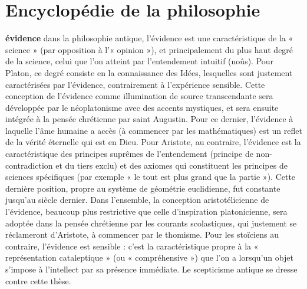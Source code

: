 
\section{Encyclopédie de la philosophie}

{\bf évidence} dans la philosophie antique,
l'évidence est une caractéristique de la
« science » (par opposition à l’« opinion »),
et principalement du plus haut
degré de la science, celui que l’on atteint
par l’entendement intuitif ({\it }noûs). Pour
Platon, ce degré consiste en la connaissance
des Idées, lesquelles sont justement
caractérisées par l’évidence, contrairement
à l'expérience sensible. Cette conception de
l'évidence comme illumination de source
transcendante sera développée par le néoplatonisme
avec des accents mystiques, et
sera ensuite intégrée à la pensée chrétienne
par saint Augustin. Pour ce dernier,
l'évidence à laquelle l’âme humaine
a accès (à commencer par les mathématiques)
est un reflet de la vérité éternelle
qui est en Dieu. Pour Aristote, au contraire,
l'évidence est la caractéristique des
principes suprêmes de l’entendement
(principe de non-contradiction et du tiers
exclu) et des axiomes qui constituent les
principes de sciences spécifiques (par
exemple « le tout est plus grand que la
partie »). Cette dernière position, propre
au système de géométrie euclidienne, fut
constante jusqu’au siècle dernier. Dans
l’ensemble, la conception aristotélicienne
de l’évidence, beaucoup plus restrictive
que celle d'inspiration platonicienne, sera
adoptée dans la pensée chrétienne par les
courants scolastiques, qui justement se
réclameront d’Aristote, à commencer par
le thomisme. Pour les stoïciens au contraire,
l'évidence est sensible : c’est la
caractéristique propre à la « représentation
cataleptique » (ou « compréhensive »)
que l’on a lorsqu'un objet s'impose à l’intellect
par sa présence immédiate. Le
scepticisme antique se dresse contre cette
thèse.

